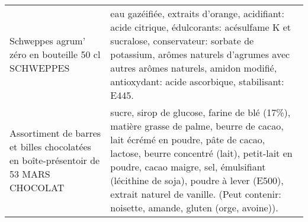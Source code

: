 \begin{longtable}{p{5cm}p{10cm}}
                                                       Schweppes agrum' zéro en bouteille 50 cl SCHWEPPES &                                                                                                                                                                                                                                                                                                                                                                                                                                                                                                                                                                                                                                                                                                                                                                       eau gazéifiée, extraits d'orange, acidifiant: acide citrique, édulcorants: acésulfame K et sucralose, conservateur: sorbate de potassium, arômes naturels d'agrumes avec autres arômes naturels, amidon modifié, antioxydant: acide ascorbique, stabilisant: E445. \\
                      Assortiment de barres et billes chocolatées en boîte-présentoir de 53 MARS CHOCOLAT &                                                                                                                                                                                                                                                                                                                                                                                                                                                                                                                                                                                                                                                                                   sucre, sirop de glucose, farine de blé (17\%), matière grasse de palme, beurre de cacao, lait écrémé en poudre, pâte de cacao, lactose, beurre concentré (lait), petit-lait en poudre, cacao maigre, sel, émulsifiant (lécithine de soja), poudre à lever (E500), extrait naturel de vanille. (Peut contenir: noisette, amande, gluten (orge, avoine)). \\

\end{longtable}
